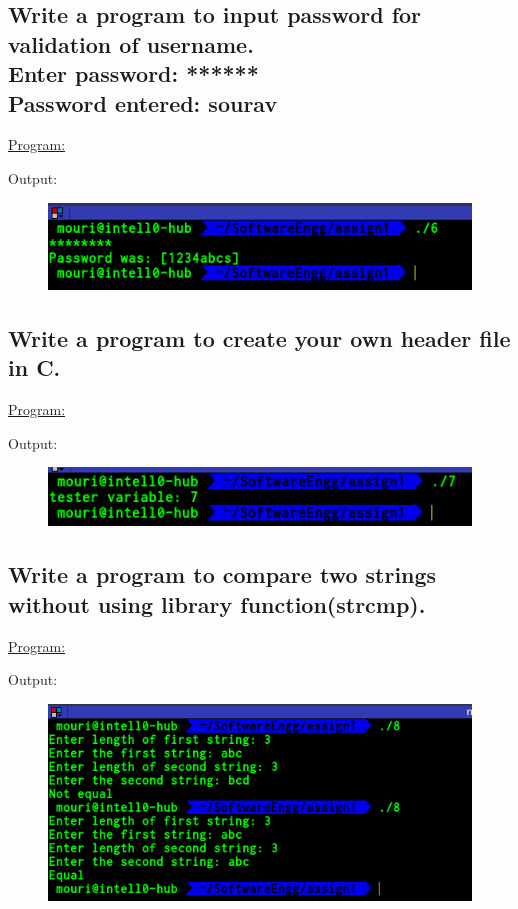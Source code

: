 \documentclass[a4paper,11pt]{article}
\begin{document}
\subsection{Write a program to input password for validation of username.\\
Enter password: ******\\
Password entered: sourav}
\underline{Program:}

Output:
\begin{figure}[H]
\centering
\includegraphics[width=350pt,height=\textheight,keepaspectratio]{./pics/6.png}
\end{figure}
\bigskip

\subsection{Write a program to create your own header file in C.}
\underline{Program:}



Output:
\begin{figure}[H]
\centering
\includegraphics[width=350pt,height=\textheight,keepaspectratio]{./pics/7.png}
\end{figure}
\bigskip


\subsection{Write a program to compare two strings without using library function(strcmp).}
\underline{Program:}

Output:
\begin{figure}[H]
\centering
\includegraphics[width=350pt,height=\textheight,keepaspectratio]{./pics/8.png}
\end{figure}
\bigskip
\end{document}
